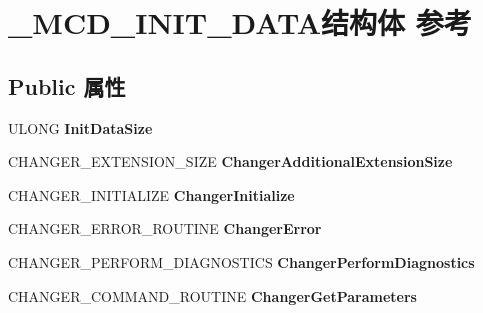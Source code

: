 \hypertarget{struct___m_c_d___i_n_i_t___d_a_t_a}{}\section{\+\_\+\+M\+C\+D\+\_\+\+I\+N\+I\+T\+\_\+\+D\+A\+T\+A结构体 参考}
\label{struct___m_c_d___i_n_i_t___d_a_t_a}
\subsection*{Public 属性}
\begin{DoxyCompactItemize}
\item 
\mbox{\label{struct___m_c_d___i_n_i_t___d_a_t_a_a6a6c595816ef993185f6bcc8703115c7}} 
U\+L\+O\+NG {\bfseries Init\+Data\+Size}
\item 
\mbox{\label{struct___m_c_d___i_n_i_t___d_a_t_a_adb0e6fce3ed081ac9cc5dc84e9997de8}} 
C\+H\+A\+N\+G\+E\+R\+\_\+\+E\+X\+T\+E\+N\+S\+I\+O\+N\+\_\+\+S\+I\+ZE {\bfseries Changer\+Additional\+Extension\+Size}
\item 
\mbox{\label{struct___m_c_d___i_n_i_t___d_a_t_a_a2e87aa7365dde5c54178b2ada3e49eee}} 
C\+H\+A\+N\+G\+E\+R\+\_\+\+I\+N\+I\+T\+I\+A\+L\+I\+ZE {\bfseries Changer\+Initialize}
\item 
\mbox{\label{struct___m_c_d___i_n_i_t___d_a_t_a_a05491b388092856f60b125fac0c28fd9}} 
C\+H\+A\+N\+G\+E\+R\+\_\+\+E\+R\+R\+O\+R\+\_\+\+R\+O\+U\+T\+I\+NE {\bfseries Changer\+Error}
\item 
\mbox{\label{struct___m_c_d___i_n_i_t___d_a_t_a_a4c7e0b147667fe4fce31c8f984b56c00}} 
C\+H\+A\+N\+G\+E\+R\+\_\+\+P\+E\+R\+F\+O\+R\+M\+\_\+\+D\+I\+A\+G\+N\+O\+S\+T\+I\+CS {\bfseries Changer\+Perform\+Diagnostics}
\item 
\mbox{\label{struct___m_c_d___i_n_i_t___d_a_t_a_ac946cf541e47e6ad5263ae59161b1ebd}} 
C\+H\+A\+N\+G\+E\+R\+\_\+\+C\+O\+M\+M\+A\+N\+D\+\_\+\+R\+O\+U\+T\+I\+NE {\bfseries Changer\+Get\+Parameters}
\item 
\mbox{\label{struct___m_c_d___i_n_i_t___d_a_t_a_a84c4554ac17ed41b13ddd3b98e910446}} 

\end{DoxyCompactItemize}
